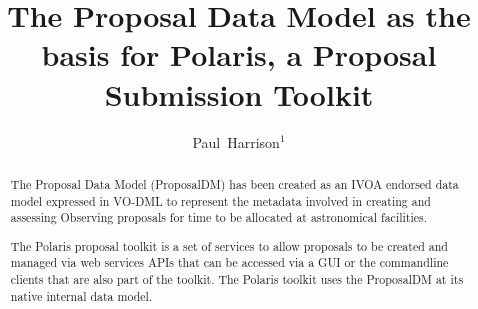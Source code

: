 \documentclass[11pt,twoside]{article}
\begin{document}
\title{The Proposal Data Model as the basis for Polaris, a Proposal Submission Toolkit}

\author{Paul~Harrison$^1$}






\begin{abstract}
The Proposal Data Model (ProposalDM) has been created as an IVOA endorsed data model expressed in VO-DML to represent the metadata involved in creating and assessing
    Observing proposals for time to be allocated at astronomical facilities.

    The Polaris proposal toolkit is a set of services to allow proposals to be created and managed via web services APIs that can be accessed via a GUI or the
    commandline clients that are also part of the toolkit.
    The Polaris toolkit uses the ProposalDM at its native internal data model.
\end{abstract}
\end{document}
